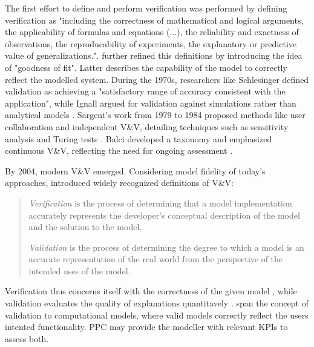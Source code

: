 The first effort to define and perform verification was performed by \autocite{machlup1955problem} defining verification as "including the correctness of mathematical and logical arguments, the applicability of formulas and equations (...), the reliability and exactness of observations, the reproducability of experiments, the explanatory or predictive value of generalizations.". \Autocite{naylor1967verification} further refined this definitions by introducing the idea of "goodness of fit". Latter describes the capability of the model to correctly reflect the modelled system. During the 1970s, researchers like Schlesinger \autocite{schlesinger1979terminology} defined validation as achieving a "satisfactory range of accuracy consistent with the application", while Ignall argued for validation against simulations rather than analytical models \autocite{ignall1978using}. Sargent's work from 1979 to 1984 proposed methods like user collaboration and independent V&V, detailing techniques such as sensitivity analysis and Turing tests \autocite{Sargent2010wsc}. Balci developed a taxonomy and emphasized continuous V&V, reflecting the need for ongoing assessment \autocite{balci2012life}.

By 2004, modern V&V emerged. Considering model fidelity of today's approaches, \autocite{Oberkampf2004amr} introduced widely recognized definitions of V&V:

\begin{quote}
  \textit{Verification} is the process of determining that a model implementation accurately represents the developer's conceptual description of the model and the solution to the model.

  \textit{Validation} is the process of determining the degree to which a model is an accurate representation of the real world from the perspective of the intended uses of the model. \autocite{Oberkampf2004amr}
\end{quote}

Verification thus concerns itself with the correctness of the given model \autocite{Sargent2010wsc}, while validation evaluates the quality of explanations quantitavely \autocite{Oberkampf2004amr}.  span the concept of validation to computational models, where valid models correctly reflect the users intented functionality. PPC may provide the modeller with relevant KPIs to assess both.

